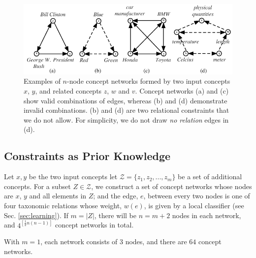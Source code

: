\begin{figure}[!t]
  \centering
  \includegraphics[totalheight=0.107\textheight]{networks}
  \caption{{\small Examples of $n$-node concept networks formed by two input
    concepts $x$, $y$, and related concepts $z$, $w$ and $v$. Concept
    networks (a) and (c) show valid combinations of edges, whereas (b)
    and (d) demonstrate invalid combinations. (b) and (d) are two
    relational constraints that we do not allow. For simplicity, we do
    not draw {\em no relation} edges in (d).}}
  \label{fig:triangles}
\end{figure}

\subsection{Constraints as Prior Knowledge}
\label{sec:cons-prior-know}
Let $x, y$ be the two input concepts let $\mathcal{Z}=\{z_1, z_2, ...,
z_m\}$ be a set of additional concepts. For a subset $Z \in
\mathcal{Z}$, we construct a set of concept networks whose nodes are
$x$, $y$ and all elements in $Z$; and the edge, $e$, between every two
nodes is one of four taxonomic relations whose weight, $w(e)$, is
given by a local classifier (see Sec. \ref{sec:learning}). If $m =
|Z|$, there will be $n=m+2$ nodes in each network, and $4^{\left [
    \frac{1}{2} n(n-1) \right ] }$ concept networks in total.
With $m=1$, each network consists of 3 nodes, and there are $64$
concept networks.
%

